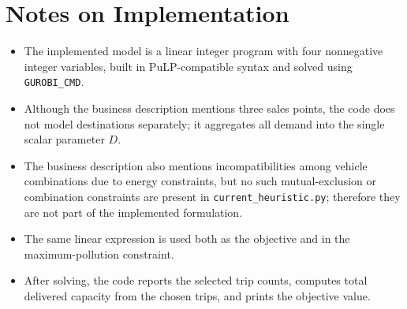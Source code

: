 \section*{Notes on Implementation}

\begin{itemize}
    \item The implemented model is a linear integer program with four nonnegative integer variables, built in PuLP-compatible syntax and solved using \texttt{GUROBI\_CMD}.
    \item Although the business description mentions three sales points, the code does not model destinations separately; it aggregates all demand into the single scalar parameter \(D\).
    \item The business description also mentions incompatibilities among vehicle combinations due to energy constraints, but no such mutual-exclusion or combination constraints are present in \texttt{current\_heuristic.py}; therefore they are not part of the implemented formulation.
    \item The same linear expression is used both as the objective and in the maximum-pollution constraint.
    \item After solving, the code reports the selected trip counts, computes total delivered capacity from the chosen trips, and prints the objective value.
\end{itemize}
